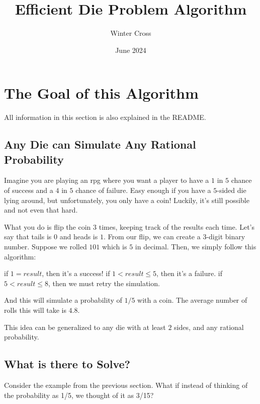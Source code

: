 \documentclass{article}
\title{Efficient Die Problem Algorithm}
\author{Winter Cross}
\date{June 2024}
\begin{document}
\maketitle

\section{The Goal of this Algorithm}
All information in this section is also explained in the README.

\subsection{Any Die can Simulate Any Rational Probability}
Imagine you are playing an rpg where you want a player to have a $1$ in $5$ chance of success and a $4$ in $5$ chance of failure.
Easy enough if you have a $5$-sided die lying around, but unfortunately, you only have a coin!\newline
Luckily, it's still possible and not even that hard.\newline

What you do is flip the coin $3$ times, keeping track of the results each time.\newline
Let's say that tails is $0$ and heads is $1$.\newline
From our flip, we can create a $3$-digit binary number. Suppose we rolled $101$ which is $5$ in decimal.\newline
Then, we simply follow this algorithm:\newline

\noindent
if $1=result$, then it's a success!\newline
if $1<result\leq5$, then it's a failure.\newline
if $5<result\leq8$, then we must retry the simulation.\newline

And this will simulate a probability of $1/5$ with a coin. The average number of rolls this will take is $4.8$.\newline

This idea can be generalized to any die with at least $2$ sides, and any rational probability.

\subsection{What is there to Solve?}
Consider the example from the previous section.\newline
What if instead of thinking of the probability as 1/5, we thought of it as 3/15?\newline
\end{document}
